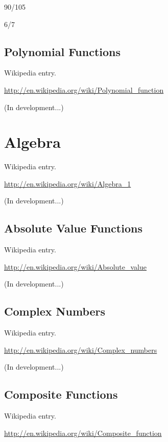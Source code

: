\documentclass[12pt,oneside]{book}
\begin{document}
{\textquotedbl}{\textquotedbl}{\textquotedbl}

90/105

{\textbar}

6/7

\subsection[Polynomial Functions]{Polynomial Functions}

Wikipedia entry.

\href{http://en.wikipedia.org/wiki/Polynomial_function}{http://en.wikipedia.org/wiki/Polynomial\_function}

(In development...)

\section[Algebra]{Algebra}

Wikipedia entry.

\href{http://en.wikipedia.org/wiki/Algebra_1}{http://en.wikipedia.org/wiki/Algebra\_1}

(In development...)

\subsection[Absolute Value Functions]{Absolute Value Functions}

Wikipedia entry.

\href{http://en.wikipedia.org/wiki/Absolute_value}{http://en.wikipedia.org/wiki/Absolute\_value}

(In development...)

\subsection[Complex Numbers]{Complex Numbers}

Wikipedia entry.

\href{http://en.wikipedia.org/wiki/Complex_numbers}{http://en.wikipedia.org/wiki/Complex\_numbers}

(In development...)

\subsection[Composite Functions]{Composite Functions}

Wikipedia entry.

\href{http://en.wikipedia.org/wiki/Composite_function}{http://en.wikipedia.org/wiki/Composite\_function}
\end{document}
